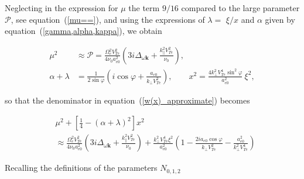 \documentclass[draft]{agujournal2019}
\renewcommand{\vec}{\mathbf}
\begin{document}
{Neglecting in the expression for $\mu$ the term $9/16$ compared to the large
parameter $\mathcal{P}$, see equation~(\ref{mu==}), and using the expressions
of $\lambda=$ $\xi/x$ and $\alpha$ given by equation~(\ref{gamma,alpha,kappa}), we obtain
\begin{linenomath*}
\begin{align*}
\mu^{2}  &  \approx\mathcal{P}=\frac{\Omega_{e}^{2}V_{Te}^{2}}{4\nu_{0}
a_{e0}^{2}}\left(3i\Delta_{\omega\vec{k}}+\frac{k_{\|}^{2}V_{Te}^{2}
}{\nu_{0}}\right)  ,\\
\alpha+\lambda &  =\frac{1}{2\sin\varphi}\left(i\cos\varphi+\frac{a_{e0}
}{k_{\perp}V_{Te}^{2}}\right)  ,\qquad x^{2}=\frac{4k_{\perp}^{2}V_{Te}%
^{4}\sin^{2}\varphi}{a_{e0}^{2}}\ \xi^{2},
\end{align*}
\end{linenomath*}
so that the denominator in equation~(\ref{w(x)_approximate}) becomes
\begin{linenomath*}
\begin{align*}
&  \mu^{2}+\left[  \frac{1}{4}-\left(  \alpha+\lambda\right)  ^{2}\right]
x^{2}\\
&  \approx\frac{\Omega_{e}^{2}V_{Te}^{2}}{4\nu_{0}a_{e0}^{2}}\left(
3i\Delta_{\omega\vec{k}}+\frac{k_{\|}^{2}V_{Te}^{2}}{\nu_{0}}\right)
+\frac{k_{\perp}^{2}V_{Te}^{4}\xi^{2}}{a_{e0}^{2}}\left(  1-\frac{2ia_{e0}
\cos\varphi}{k_{\perp}V_{Te}^{2}}-\frac{a_{e0}^{2}}{k_{\perp}^{2}V_{Te}^{4}}\right)
\end{align*}
\end{linenomath*}
Recalling the definitions of the parameters $N_{0,1,2}$
}
\end{document}
